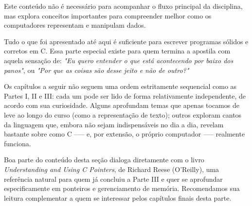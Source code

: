 \begin{tcolorbox}[title={Para ir além}]
Este conteúdo não é necessário para acompanhar o fluxo principal
da disciplina, mas explora conceitos importantes para compreender
melhor como os computadores representam e manipulam dados.
\end{tcolorbox}

Tudo o que foi apresentado até aqui é suficiente para escrever programas sólidos e corretos em C. Essa parte especial existe para quem termina a apostila com aquela sensação de: \textit{"Eu quero entender o que está acontecendo por baixo dos panos"}, ou \textit{"Por que as coisas são desse jeito e não de outro?"}

Os capítulos a seguir não seguem uma ordem estritamente sequencial como as Partes I, II e III: cada um pode ser lido de forma relativamente independente, de acordo com sua curiosidade. Alguns aprofundam temas que apenas tocamos de leve ao longo do curso (como a representação de texto); outros exploram cantos da linguagem que, embora não sejam indispensáveis no dia a dia, revelam bastante sobre como C --— e, por extensão, o próprio computador —-- realmente funciona.

Boa parte do conteúdo desta seção dialoga diretamente com o livro \textit{Understanding and Using C Pointers}, de Richard Reese (O'Reilly), uma referência natural para quem já concluiu a Parte III e quer se aprofundar especificamente em ponteiros e gerenciamento de memória. Recomendamos sua leitura complementar a quem se interessar pelos capítulos finais desta parte.
